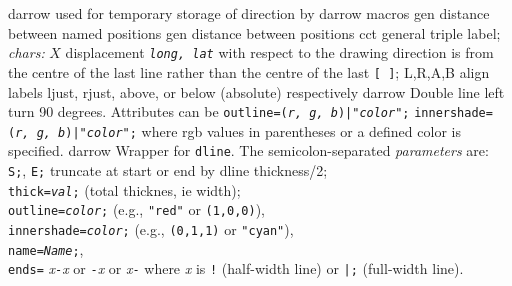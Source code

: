 %
  {darrow}%
  {used for temporary storage of direction by darrow macros}%
%
  {gen}%
  {distance between named positions}%
%
  {gen}%
  {distance between positions}%
%
  {cct}%
  {general triple label; {\sl chars:}
    $X$ displacement {\tt {\sl long, lat}} with respect to the drawing
      direction is from the centre of the last
      line rather than the centre of the last {\tt [ ]};
    L,R,A,B align labels ljust, rjust, above,
      or below (absolute) respectively  }%
%
  {darrow}%
  {Double line left turn 90 degrees.  Attributes can be
    {\tt outline=({\sl r, g, b})|"{\sl color}";}
    {\tt innershade=({\sl r, g, b})|"{\sl color}";}
    where rgb values in parentheses or a defined color is specified.}%
%
  {darrow}%
  {Wrapper for {\tt dline}.
  The semicolon-separated {\sl parameters} are:\\
    {\tt S;}, {\tt E;} truncate at start or end by dline thickness/2;\\
    {\tt thick={\sl val};}   (total thicknes, ie width);\\
    {\tt outline={\sl color};} (e.g., {\tt "red"} or {\tt (1,0,0)}),\\
    {\tt innershade={\sl color};} (e.g., {\tt (0,1,1)} or {\tt "cyan"}),\\
    {\tt name={\sl Name};},\\
    {\tt ends=}%
      {\sl x}{\tt -}{\sl x} or
      {\tt -}{\sl x} or
      {\sl x}{\tt -} where {\sl x} is {\tt !} (half-width line)
       or {\tt |;} (full-width line).}%
%
